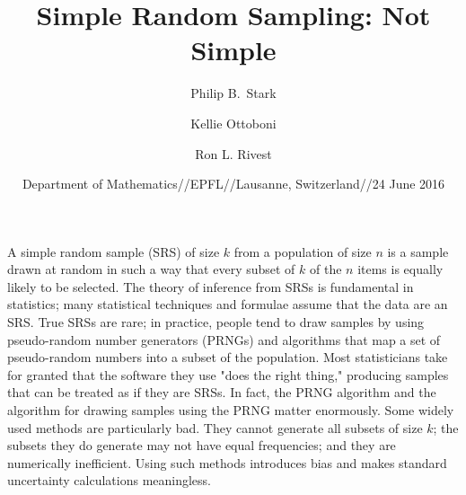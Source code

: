 \documentclass[fleqn]{beamer}
\theoremstyle{plain}
\begin{document}
\title[] %
{Simple Random Sampling: Not Simple}

\author{Philip B.~Stark}
\author{Kellie Ottoboni}
\author{Ron L. Rivest}


\date{Department of Mathematics//EPFL//Lausanne, Switzerland//24 June 2016}


\subject{Random Sampling}




\begin{frame}
  \titlepage
\end{frame}

\begin{frame}
  {\small A simple random sample (SRS) of size $k$ from a population of size $n$ is a sample drawn 
at random in such a way that every subset of $k$ of the $n$ items is equally likely to be selected. 
The theory of inference from SRSs is fundamental in statistics;
many statistical techniques and formulae assume that the data are an SRS.
True SRSs are rare; in practice, people tend to draw samples by using pseudo-random number generators 
(PRNGs) and algorithms that map a set of pseudo-random numbers into a subset of the population. 
Most statisticians take for granted that the software they use "does the right thing," 
producing samples that can be treated as if they are SRSs.
In fact, the PRNG algorithm and the algorithm for drawing samples using the PRNG matter
enormously.
Some widely used methods are particularly bad.
They cannot generate all subsets of size $k$; the subsets they do generate
may not have equal frequencies; and they are numerically inefficient.
Using such methods introduces bias and makes standard uncertainty calculations meaningless.
}
\end{frame}
\end{document}
